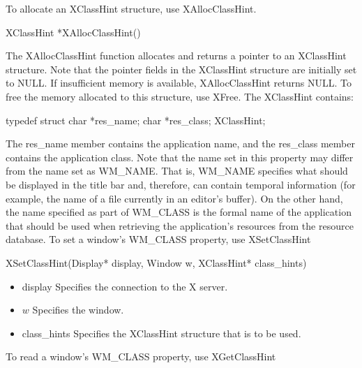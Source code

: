 \documentclass{report}
\begin{document}
\begin{itemize}
\begin{itemize}
            \bigbreak \noindent 
            To allocate an XClassHint structure, use XAllocClassHint.
            \bigbreak \noindent 
            \begin{cppcode}
            XClassHint *XAllocClassHint()
            \end{cppcode}
            \bigbreak \noindent 
            The XAllocClassHint function allocates and returns a pointer to an XClassHint structure. Note that the pointer fields in the XClassHint structure are initially set to NULL. If insufficient memory is available, XAllocClassHint returns NULL. To free the memory allocated to this structure, use XFree.
            \bigbreak \noindent 
            The XClassHint contains:
            \bigbreak \noindent 
            \begin{cppcode}
                typedef struct {
                    char *res_name;
                    char *res_class;
                } XClassHint;
            \end{cppcode}
            \bigbreak \noindent 
            The res\_name member contains the application name, and the res\_class member contains the application class. Note that the name set in this property may differ from the name set as WM\_NAME. That is, WM\_NAME specifies what should be displayed in the title bar and, therefore, can contain temporal information (for example, the name of a file currently in an editor’s buffer). On the other hand, the name specified as part of WM\_CLASS is the formal name of the application that should be used when retrieving the application’s resources from the resource database.
            \bigbreak \noindent 
            To set a window’s WM\_CLASS property, use XSetClassHint
            \bigbreak \noindent 
            \begin{cppcode}
            XSetClassHint(Display* display, Window w, XClassHint* class_hints)
            \end{cppcode}
            \bigbreak \noindent
            \begin{itemize}
                \item display Specifies the connection to the X server.
                \item $w$ Specifies the window.
                \item class\_hints Specifies the XClassHint structure that is to be used.
            \end{itemize}
            To read a window’s WM\_CLASS property, use XGetClassHint
            \bigbreak \noindent 
            \begin{cppcode}

\end{cppcode}
\end{itemize}
\end{itemize}
\end{document}
